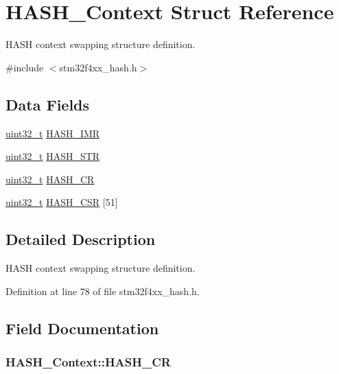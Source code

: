 \hypertarget{struct_h_a_s_h___context}{\section{H\-A\-S\-H\-\_\-\-Context Struct Reference}
\label{struct_h_a_s_h___context}
}


H\-A\-S\-H context swapping structure definition.  




{\ttfamily \#include $<$stm32f4xx\-\_\-hash.\-h$>$}

\subsection*{Data Fields}
\begin{DoxyCompactItemize}
\item 
\hyperlink{stdint_8h_a435d1572bf3f880d55459d9805097f62}{uint32\-\_\-t} \hyperlink{struct_h_a_s_h___context_a1d452257d17957b667b5494293c17e98}{H\-A\-S\-H\-\_\-\-I\-M\-R}
\item 
\hyperlink{stdint_8h_a435d1572bf3f880d55459d9805097f62}{uint32\-\_\-t} \hyperlink{struct_h_a_s_h___context_a8b7c5e03086e4a4a4a2c2ab55242f280}{H\-A\-S\-H\-\_\-\-S\-T\-R}
\item 
\hyperlink{stdint_8h_a435d1572bf3f880d55459d9805097f62}{uint32\-\_\-t} \hyperlink{struct_h_a_s_h___context_aacab5a3e63d0672af4d9dfa5dbdd35ca}{H\-A\-S\-H\-\_\-\-C\-R}
\item 
\hyperlink{stdint_8h_a435d1572bf3f880d55459d9805097f62}{uint32\-\_\-t} \hyperlink{struct_h_a_s_h___context_af9b34ce8707c2d48149e0a949d4214cc}{H\-A\-S\-H\-\_\-\-C\-S\-R} \mbox{[}51\mbox{]}
\end{DoxyCompactItemize}


\subsection{Detailed Description}
H\-A\-S\-H context swapping structure definition. 

Definition at line 78 of file stm32f4xx\-\_\-hash.\-h.



\subsection{Field Documentation}
\hypertarget{struct_h_a_s_h___context_aacab5a3e63d0672af4d9dfa5dbdd35ca}{
\subsubsection[{H\-A\-S\-H\-\_\-\-C\-R}]{ H\-A\-S\-H\-\_\-\-Context\-::\-H\-A\-S\-H\-\_\-\-C\-R}}\label{struct_h_a_s_h___context_aacab5a3e63d0672af4d9dfa5dbdd35ca}


